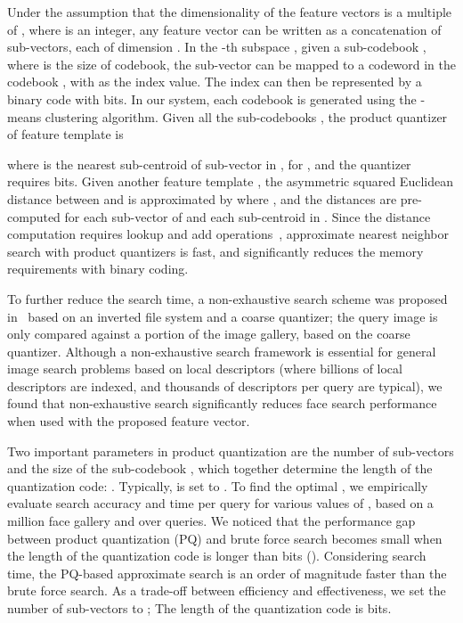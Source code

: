 \documentclass[10pt,journal,compsoc]{IEEEtran}
\begin{document}
Under the assumption that the dimensionality  of the feature vectors is a multiple of , where  is an integer, any feature vector  can be written as a concatenation
 of  sub-vectors, each of dimension . In the -th subspace , given a sub-codebook , where  is the size of codebook, the sub-vector  can be mapped to a {codeword}  in the codebook ,
with  as the index value. The index  can then be represented by a binary code with  bits. In our system, each codebook is generated using the -means clustering algorithm. Given all the  sub-codebooks , the product quantizer of feature template  is

where  is the nearest sub-centroid of sub-vector  in , for , and the quantizer  requires  bits. Given another feature template , the asymmetric squared Euclidean distance between  and  is approximated by 
where , and the distances  are pre-computed for each sub-vector of  and each sub-centroid in . Since the distance computation requires  lookup and add operations~\cite{retrieval:pq}, approximate nearest neighbor search with product quantizers is fast, and significantly reduces the memory requirements with binary coding.

To further reduce the search time, a non-exhaustive search scheme was proposed in~\cite{retrieval:pq, retrieval:lopq} based on an inverted file system and a coarse quantizer; the query image is only compared against a portion of the image gallery, based on the coarse quantizer. Although a non-exhaustive search framework is essential for general image search problems based on local descriptors (where billions of local descriptors are indexed, and thousands of descriptors per query are typical), we found that non-exhaustive search significantly reduces face search performance when used with the proposed  feature vector.


Two important parameters in product quantization are the number of sub-vectors  and the size of the sub-codebook , which together determine the length of the quantization code: . Typically,  is set to . To find the optimal , we empirically evaluate search accuracy and time per query for various values of , based on a  million face gallery and over  queries.
We noticed that the performance gap between product quantization (PQ) and brute force search becomes small when the length of the quantization code is longer than  bits (). Considering search time, the PQ-based approximate search is an order of magnitude faster than the brute force search. As a trade-off between efficiency and effectiveness, we set the number of sub-vectors  to ; The length of the quantization code is  bits.
\end{document}

